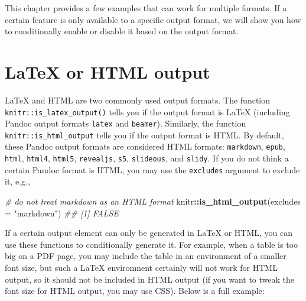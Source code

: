 \documentclass[
  11pt,
]{krantz}
\newenvironment{Shaded}{\begin{snugshade}}{\end{snugshade}}
\newcommand{\CommentTok}[1]{\textcolor[rgb]{0.37,0.37,0.37}{\textit{#1}}}
\newcommand{\DataTypeTok}[1]{\textcolor[rgb]{0.27,0.27,0.27}{#1}}
\newcommand{\KeywordTok}[1]{\textcolor[rgb]{0.27,0.27,0.27}{\textbf{#1}}}
\newcommand{\NormalTok}[1]{#1}
\newcommand{\OperatorTok}[1]{\textcolor[rgb]{0.43,0.43,0.43}{\textbf{#1}}}
\newcommand{\StringTok}[1]{\textcolor[rgb]{0.5,0.5,0.5}{#1}}
\begin{document}
This chapter provides a few examples that can work for multiple formats. If a certain feature is only available to a specific output format, we will show you how to conditionally enable or disable it based on the output format.

\hypertarget{latex-html}{%
\section{LaTeX or HTML output}\label{latex-html}}

LaTeX and HTML are two commonly used output formats. The function \texttt{knitr::is\_latex\_output()} tells you if the output format is LaTeX (including Pandoc output formats \texttt{latex} and \texttt{beamer}). Similarly, the function \texttt{knitr::is\_html\_output} tells you if the output format is HTML. By default, these Pandoc output formats are considered HTML formats: \texttt{markdown}, \texttt{epub}, \texttt{html}, \texttt{html4}, \texttt{html5}, \texttt{revealjs}, \texttt{s5}, \texttt{slideous}, and \texttt{slidy}. If you do not think a certain Pandoc format is HTML, you may use the \texttt{excludes} argument to exclude it, e.g.,

\begin{Shaded}
\begin{Highlighting}[]
\CommentTok{# do not treat markdown as an HTML format}
\NormalTok{knitr}\OperatorTok{::}\KeywordTok{is_html_output}\NormalTok{(}\DataTypeTok{excludes =} \StringTok{"markdown"}\NormalTok{)}
\CommentTok{## [1] FALSE}
\end{Highlighting}
\end{Shaded}

If a certain output element can only be generated in LaTeX or HTML, you can use these functions to conditionally generate it. For example, when a table is too big on a PDF page, you may include the table in an environment of a smaller font size, but such a LaTeX environment certainly will not work for HTML output, so it should not be included in HTML output (if you want to tweak the font size for HTML output, you may use CSS). Below is a full example:
\end{document}
